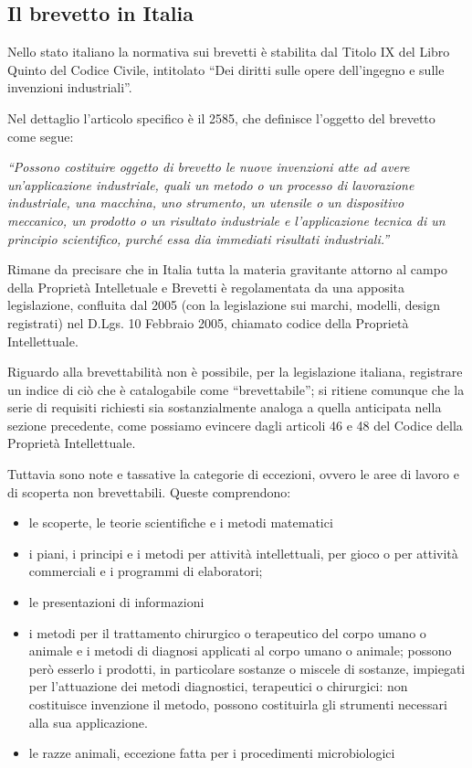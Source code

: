 \subsection{Il brevetto in Italia}
Nello stato italiano la normativa sui brevetti è stabilita dal Titolo IX del Libro Quinto del Codice Civile, intitolato ``Dei diritti sulle opere dell'ingegno e sulle invenzioni industriali''. 

Nel dettaglio l'articolo specifico è il 2585, che definisce l'oggetto del brevetto come segue:

\textit{``Possono costituire oggetto di brevetto le nuove invenzioni atte ad avere un'applicazione industriale, quali un metodo o un processo di lavorazione industriale, una macchina, uno strumento, un utensile o un dispositivo meccanico, un prodotto o un risultato industriale e l'applicazione tecnica di un principio scientifico, purché essa dia immediati risultati industriali.''}

Rimane da precisare che in Italia tutta la materia gravitante attorno al campo della Proprietà Intelletuale e Brevetti è regolamentata da una apposita legislazione, confluita dal 2005 (con la legislazione sui marchi, modelli, design registrati) nel D.Lgs. 10 Febbraio 2005, chiamato codice della Proprietà Intellettuale.

Riguardo alla brevettabilità non è possibile, per la legislazione italiana, registrare un indice di ciò che è catalogabile come ``brevettabile''; si ritiene comunque che la serie di requisiti richiesti sia sostanzialmente analoga a quella anticipata nella sezione precedente, come possiamo evincere dagli articoli 46 e 48 del Codice della Proprietà Intellettuale. 

Tuttavia sono note e tassative la categorie di eccezioni, ovvero le aree di lavoro e di scoperta non brevettabili. Queste comprendono:
\begin{itemize}
\item le scoperte, le teorie scientifiche e i metodi matematici
\item i piani, i principi e i metodi per attività intellettuali, per gioco o per attività commerciali e i programmi di elaboratori;
\item le presentazioni di informazioni
\item i metodi per il trattamento chirurgico o terapeutico del corpo umano o animale e i metodi di diagnosi applicati al corpo umano o animale; possono però esserlo i prodotti, in particolare sostanze o miscele di sostanze, impiegati per l'attuazione dei metodi diagnostici, terapeutici o chirurgici: non costituisce invenzione il metodo, possono costituirla gli strumenti necessari alla sua applicazione.
\item le razze animali, eccezione fatta per i procedimenti microbiologici\end{itemize}

